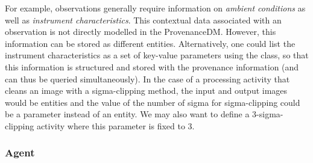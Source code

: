 For example, observations generally require information on \emph{ambient conditions} as well as 
\emph{instrument characteristics}. This contextual data associated with an observation is not directly modelled in the ProvenanceDM. However, this information can be stored as different entities. Alternatively, one could list the instrument characteristics as a set of key-value parameters using the  class, so that this information is structured and stored with the provenance information (and can thus be queried simultaneously). In the case of a processing activity that cleans an image with a sigma-clipping method, the input and output images would be entities and the value of the number of sigma for sigma-clipping could be a parameter instead of an entity. We may also want to define a 3-sigma-clipping activity where this parameter is fixed to 3.


%




\subsubsection{Agent}\label{sec:w3c-agent}

